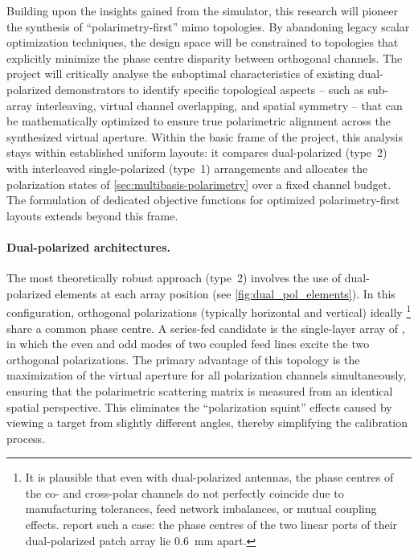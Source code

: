 Building upon the insights gained from the simulator, this research will pioneer the synthesis of \enquote{polarimetry-first} \gls{mimo} topologies.
By abandoning legacy scalar optimization techniques, the design space will be constrained to topologies that explicitly minimize the phase centre disparity between orthogonal channels.
The project will critically analyse the suboptimal characteristics of existing dual-polarized demonstrators to identify specific topological aspects -- such as sub-array interleaving, virtual channel overlapping, and spatial symmetry -- that can be mathematically optimized to ensure true polarimetric alignment across the synthesized virtual aperture.
Within the basic frame of the project, this analysis stays within established uniform layouts: it compares dual-polarized (type~2) with interleaved single-polarized (type~1) arrangements and allocates the polarization states of \cref{sec:multibasis-polarimetry} over a fixed channel budget.
The formulation of dedicated objective functions for optimized polarimetry-first layouts extends beyond this frame.

\paragraph{Dual-polarized architectures.}
The most theoretically robust approach (type~2) involves the use of dual-polarized elements at each array position (see \cref{fig:dual_pol_elements}).
In this configuration, orthogonal polarizations (typically horizontal and vertical) ideally%
    \footnote{It is plausible that even with dual-polarized antennas, the phase centres of the co- and cross-polar channels do not perfectly coincide due to manufacturing tolerances, feed network imbalances, or mutual coupling effects.
    \textcite{hambergerMixedCircularLinear2019} report such a case: the phase centres of the two linear ports of their dual-polarized patch array lie \qty{0.6}{mm} apart.}
share a common phase centre.
A series-fed candidate is the single-layer array of \textcite{dengSeriesFedDualPolarizedSingleLayer2019}, in which the even and odd modes of two coupled feed lines excite the two orthogonal polarizations.
The primary advantage of this topology is the maximization of the virtual aperture for all polarization channels simultaneously, ensuring that the polarimetric scattering matrix is measured from an identical spatial perspective.
This eliminates the \enquote{polarization squint} effects caused by viewing a target from slightly different angles, thereby simplifying the calibration process.

